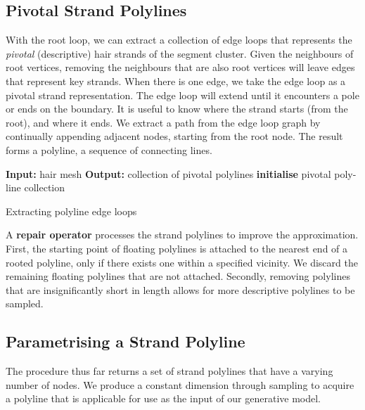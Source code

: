 \documentclass[ %
author={Dillon Keith Diep},
supervisor={Dr. Carl Henrik Ek},
degree={MEng},
title={ART-CG Hair:},
subtitle={Assisted Real-time Content Generation of Stylised Virtual Hair},
type={Research},
year={2017} ]{dissertation}
\begin{document}
	\subsection{Pivotal Strand Polylines}
	With the root loop, we can extract a collection of edge loops that represents the \textit{pivotal} (descriptive) hair strands of the segment cluster. Given the neighbours of root vertices, removing the neighbours that are also root vertices will leave edges that represent key strands. When there is one edge, we take the edge loop as a pivotal strand representation. The edge loop will extend until it encounters a pole or ends on the boundary. It is useful to know where the strand starts (from the root), and where it ends. We extract a path from the edge loop graph by continually appending adjacent nodes, starting from the root node. The result forms a polyline, a sequence of connecting lines.
	
	\begin{algorithm}[!h]
		\algrule
		\textbf{Input:} hair mesh\;
		\textbf{Output:} collection of pivotal polylines\;
		\algrule
		\textbf{initialise}\;
		\Return pivotal poly-line collection\;
		\caption{Extracting polyline edge loops}
	\end{algorithm}
	
	A \textbf{repair operator} processes the strand polylines to improve the approximation. First, the starting point of floating polylines is attached to the nearest end of a rooted polyline, only if there exists one within a specified vicinity. We discard the remaining floating polylines that are not attached. Secondly, removing polylines that are insignificantly short in length allows for more descriptive polylines to be sampled.
	
	\subsection{Parametrising a Strand Polyline}
	The procedure thus far returns a set of strand polylines that have a varying number of nodes. We produce a constant dimension through sampling to acquire a polyline that is applicable for use as the input of our generative model.
	
\end{document}

